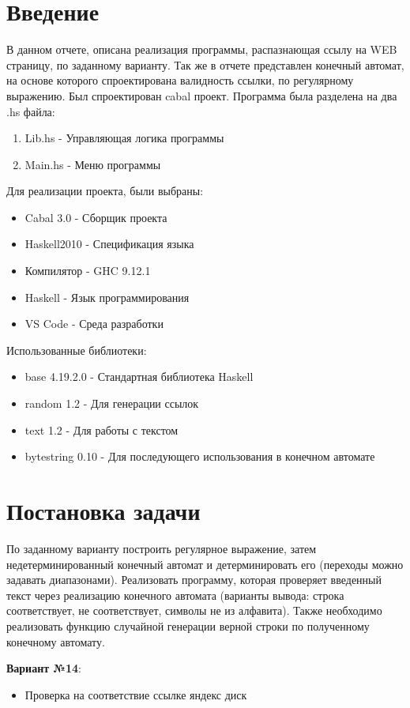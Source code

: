 \documentclass[areasetadvanced]{scrartcl}
\begin{document}
\section*{Введение}
В данном отчете, описана реализация программы, распазнающая ссылу на WEB страницу, по заданному варианту. Так же в отчете представлен конечный автомат, на основе которого спроектирована валидность ссылки, по регулярному выражению.
Был спроектирован cabal проект. Программа была разделена на два .hs файла:
\begin{enumerate}
    \item Lib.hs - Управляющая логика программы
    \item Main.hs - Меню программы
\end{enumerate}
Для реализации проекта, были выбраны:
\begin{itemize}
    \item Cabal 3.0 - Сборщик проекта
    \item Haskell2010 - Спецификация языка
    \item Компилятор - GHC 9.12.1
    \item Haskell - Язык программирования
    \item VS Code - Среда разработки
\end{itemize}
Использованные библиотеки:
\begin{itemize}
    \item base 4.19.2.0 - Стандартная библиотека Haskell
    \item random 1.2 - Для генерации ссылок
    \item text 1.2 - Для работы с текстом
    \item bytestring 0.10 - Для последующего использования в конечном автомате
\end{itemize}
\newpage
\section{Постановка задачи}
По заданному варианту построить регулярное выражение, затем
недетерминированный конечный автомат и детерминировать его (переходы можно
задавать диапазонами). Реализовать программу, которая проверяет введенный текст
через реализацию конечного автомата (варианты вывода: строка соответствует, не
соответствует, символы не из алфавита). Также необходимо реализовать функцию
случайной генерации верной строки по полученному конечному автомату.

\textbf{Вариант №14}:
\begin{itemize}
    \item Проверка на соответствие ссылке яндекс диск
\end{itemize}
\end{document}
